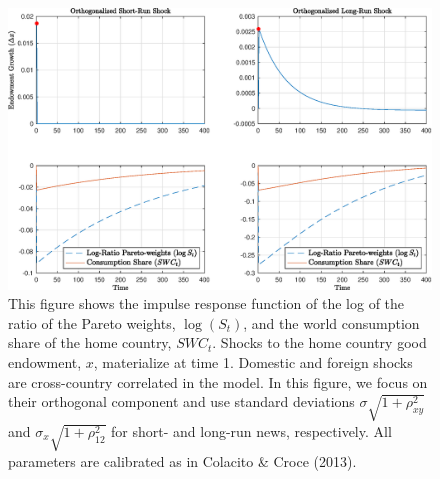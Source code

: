 

\begin{figure}[h!]
	\centering
	\caption{This figure shows the impulse response	function of the log of the ratio of the Pareto weights, $\log(S_t)$, and the world consumption share of the home country, $SWC_t$. Shocks to the home country good endowment, $x$, materialize at time 1. Domestic and foreign shocks are cross-country correlated in the model. In this figure, we focus on their orthogonal component and use standard deviations $ \sigma\sqrt{1+\rho^2_{xy}}$ and $ \sigma_x\sqrt{1+\rho^2_{12}}$ for short- and long-run news, respectively. All parameters are calibrated as in Colacito \& Croce (2013).}
	\includegraphics[scale=0.6]{fig/fig2.eps}
\end{figure}